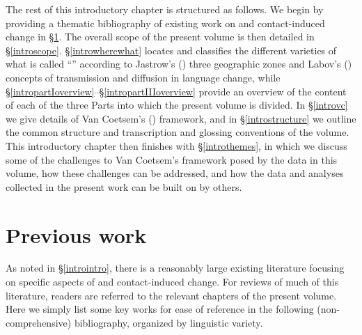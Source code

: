 \documentclass[output=paper]{langsci/langscibook}
\begin{document}
The rest of this introductory chapter is structured as follows. We begin by providing a thematic bibliography of existing work on  and contact-induced change in §\ref{introexistingwork}. The overall scope of the present volume is then detailed in §\ref{introscope}. §\ref{introwherewhat} locates and classifies the different varieties of what is called ``'' according to Jastrow's (\citeyear{Jastrow2002}) three geographic zones and Labov's (\citeyear{Labov2007}) concepts of {transmission} and {diffusion} in {language change}, while §\ref{intropartIoverview}--§\ref{intropartIIIoverview} provide an overview of the content of each of the three Parts into which the present volume is divided. In §\ref{introvc} we give details of Van Coetsem's (\citeyear{VanCoetsem1988,VanCoetsem2000}) framework, and in §\ref{introstructure} we outline the common structure and transcription and glossing conventions of the volume. This introductory chapter then finishes with §\ref{introthemes}, in which we discuss some of the challenges to Van Coetsem's framework posed by the data in this volume, how these challenges can be addressed, and how the data and analyses collected in the present work can be built on by others.


\section{Previous work}\label{introexistingwork}

As noted in §\ref{introintro}, there is a reasonably large existing literature {focusing} on specific aspects of  and contact-induced change. For reviews of much of this literature, readers are referred to the relevant chapters of the present volume. Here we simply list some key works for ease of reference in the following (non-comprehensive) bibliography, organized by linguistic variety.\pagebreak
\end{document}
